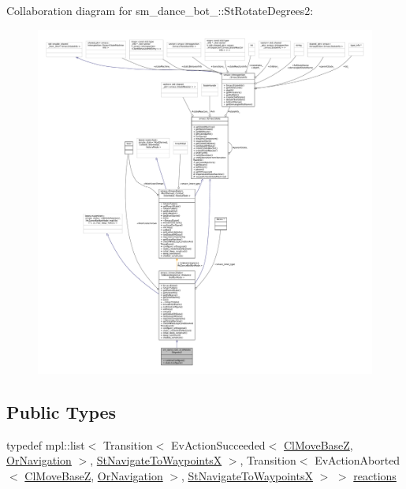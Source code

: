 Collaboration diagram for sm\+\_\+dance\+\_\+bot\+\_\+:\+:St\+Rotate\+Degrees2\+:
\nopagebreak
\begin{figure}[H]
\begin{center}
\leavevmode
\includegraphics[width=350pt]{structsm__dance__bot__3_1_1StRotateDegrees2__coll__graph}
\end{center}
\end{figure}
\subsection*{Public Types}
\begin{DoxyCompactItemize}
\item 
typedef mpl\+::list$<$ Transition$<$ Ev\+Action\+Succeeded$<$ \hyperlink{classmove__base__z__client_1_1ClMoveBaseZ}{Cl\+Move\+BaseZ}, \hyperlink{classsm__dance__bot__3_1_1OrNavigation}{Or\+Navigation} $>$, \hyperlink{structsm__dance__bot__3_1_1StNavigateToWaypointsX}{St\+Navigate\+To\+WaypointsX} $>$, Transition$<$ Ev\+Action\+Aborted$<$ \hyperlink{classmove__base__z__client_1_1ClMoveBaseZ}{Cl\+Move\+BaseZ}, \hyperlink{classsm__dance__bot__3_1_1OrNavigation}{Or\+Navigation} $>$, \hyperlink{structsm__dance__bot__3_1_1StNavigateToWaypointsX}{St\+Navigate\+To\+WaypointsX} $>$ $>$ \hyperlink{structsm__dance__bot__3_1_1StRotateDegrees2_ab4f9ea0f49f9b8dc2a88822d64a1ac87}{reactions}
\end{DoxyCompactItemize}
